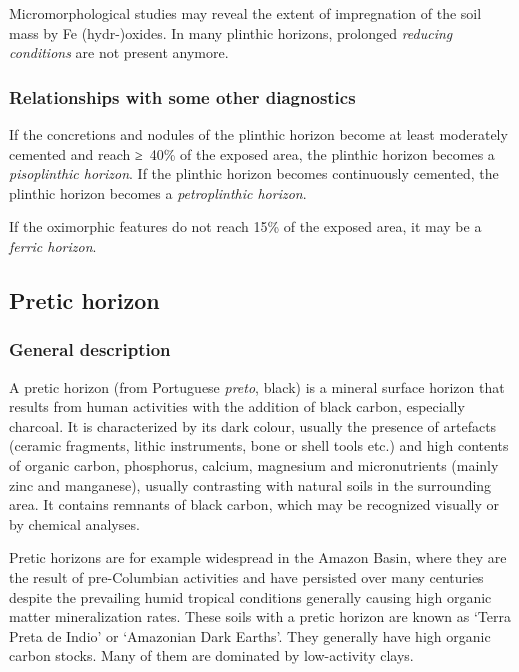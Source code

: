 \documentclass[
  letterpaper,
  DIV=11,
  numbers=noendperiod]{scrreprt}
\begin{document}
Micromorphological studies may reveal the extent of impregnation of the
soil mass by Fe (hydr-)oxides. In many plinthic horizons, prolonged
\emph{reducing conditions} are not present anymore.

\hypertarget{relationships-with-some-other-diagnostics-29}{%
\subsubsection{Relationships with some other
diagnostics}\label{relationships-with-some-other-diagnostics-29}}

If the concretions and nodules of the plinthic horizon become at least
moderately cemented and reach ≥~40\% of the exposed area, the plinthic
horizon becomes a \emph{pisoplinthic horizon}. If the plinthic horizon
becomes continuously cemented, the plinthic horizon becomes a
\emph{petroplinthic horizon}.

If the oximorphic features do not reach 15\% of the exposed area, it may
be a \emph{ferric horizon}.

\hypertarget{pretic-horizon}{%
\subsection{Pretic horizon}\label{pretic-horizon}}

\hypertarget{general-description-30}{%
\subsubsection{General description}\label{general-description-30}}

A pretic horizon (from Portuguese \emph{preto}, black) is a mineral
surface horizon that results from human activities with the addition of
black carbon, especially charcoal. It is characterized by its dark
colour, usually the presence of artefacts (ceramic fragments, lithic
instruments, bone or shell tools etc.) and high contents of organic
carbon, phosphorus, calcium, magnesium and micronutrients (mainly zinc
and manganese), usually contrasting with natural soils in the
surrounding area. It contains remnants of black carbon, which may be
recognized visually or by chemical analyses.

Pretic horizons are for example widespread in the Amazon Basin, where
they are the result of pre-Columbian activities and have persisted over
many centuries despite the prevailing humid tropical conditions
generally causing high organic matter mineralization rates. These soils
with a pretic horizon are known as `Terra Preta de Indio' or `Amazonian
Dark Earths'. They generally have high organic carbon stocks. Many of
them are dominated by low-activity clays.
\end{document}
